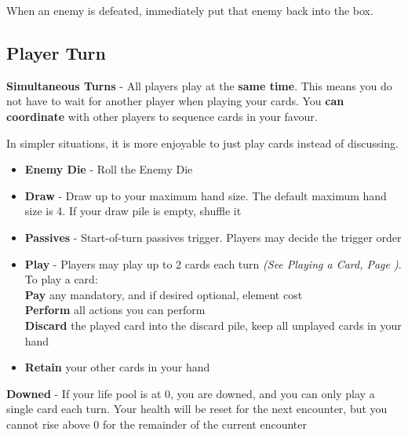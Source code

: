 \begin{tcolorbox}[colframe=black, colback=white]
	When an enemy is defeated, immediately put that enemy back into the box.
\end{tcolorbox}


\subsection*{Player Turn}

\textbf{Simultaneous Turns} - All players play at the  \textbf{same time}. This means you do not have to wait for another player when playing your cards. You  \textbf{can coordinate} with other players to sequence cards in your favour.
\begin{tcolorbox}[colframe=black, colback=white]
	In simpler situations, it is more enjoyable to just play cards instead of discussing.
\end{tcolorbox}

\begin{itemize}
	\item \textbf{Enemy Die} - Roll the Enemy Die
	\item \textbf{Draw} - Draw up to your maximum hand size. The default maximum hand size is 4. If your draw pile is empty, shuffle it\\
	\item \textbf{Passives} - Start-of-turn passives trigger. Players may decide the trigger order
	\item \textbf{Play} - Players may play up to 2 cards each turn \textit{(See Playing a Card, Page \pageref{Section_PlayingACard})}.
	To play a card:\\ 
	\hspace*{1cm} \textbf{Pay} any mandatory, and if desired optional, element cost\\
	\hspace*{1cm} \textbf{Perform} all actions you can perform\\
	\hspace*{1cm} \textbf{Discard} the played card into the discard pile, keep all unplayed cards in your hand\\
	\item \textbf{Retain} your other cards in your hand
\end{itemize}
\begin{tcolorbox}[colframe=black, colback=white]
	\textbf{Downed} - If your life pool is at 0, you are downed, and you can only play a single card each turn. Your health will be reset for the next encounter, but you cannot rise above 0 for the remainder of the current encounter\\
\end{tcolorbox}
